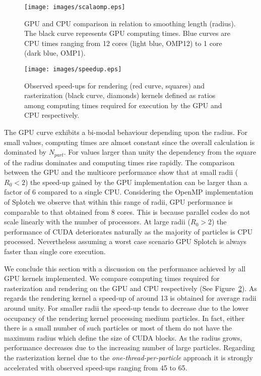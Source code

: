 \documentclass[1p]{elsarticle}
\begin{document}
\begin{figure}
\centering
\texttt{[image: images/scalaomp.eps]}
\caption{GPU and CPU comparison in relation to smoothing length (radius). The black curve represents GPU computing times. Blue curves are CPU times ranging from 12 cores (light blue, OMP12) to 1 core (dark blue, OMP1).}
\label{fig:gpucpu}
\end{figure}

\begin{figure}
\centering
\texttt{[image: images/speedup.eps]}
\caption{
Observed speed-ups for rendering (red curve, squares) and rasterization (black curve, diamonds) kernels defined as ratios among computing times required for execution by the GPU and CPU respectively.
}
\label{fig:speedup}
\end{figure}

The GPU curve exhibits a bi-modal behaviour depending upon the radius. For small values, computing times are almost constant since the overall calculation is dominated by $N_{part}$. For values larger than unity the dependency from the square of the radius dominates and computing times rise rapidly. The comparison between the GPU and the multicore performance show that at small radii ($R_0 < 2$) the speed-up gained by the GPU implementation can be larger than a factor of 6 compared to a single CPU. Considering the OpenMP implementation of Splotch we observe that within this range of radii, GPU performance is comparable to that obtained from 8 cores. This is because parallel codes do not scale linearly with the number of processors. At large radii ($R_0 > 2$) the performance of CUDA deteriorates naturally as the majority of particles is CPU processed. Nevertheless assuming a worst case scenario GPU Splotch is always faster than single core execution. 

We conclude this section with a discussion on the performance achieved by all GPU kernels implemented. We compare computing times required for rasterization and rendering on the GPU and CPU respectively (See Figure~\ref{fig:speedup}). As regards the rendering kernel a speed-up of around 13 is obtained for average radii around unity. For smaller radii the speed-up tends to decrease due to the lower occupancy of the rendering kernel processing medium particles. In fact, either there is a small number of such particles or most of them do not have the maximum radius which define the size of CUDA blocks.
As the radius grows, performance decreases due to the increasing number of large particles.
Regarding the rasterization kernel due to the {\it one-thread-per-particle} approach it is strongly accelerated with observed speed-ups ranging from 45 to 65.  
\end{document}
